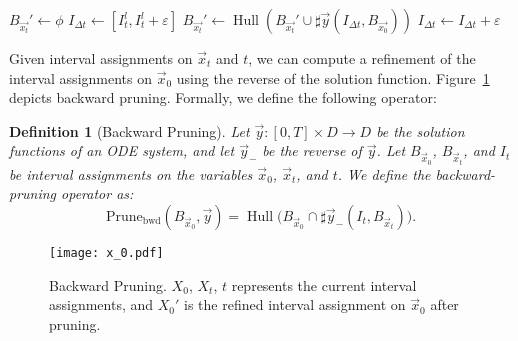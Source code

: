 \documentclass[12pt]{article}
\newtheorem{definition}[theorem]{Definition}
\newcommand{\prunefwd}{\mathrm{Prune}_{\mathrm{fwd}}}
\newcommand{\BXt}{\ensuremath{B_{\vec{x_t}}}}
\newcommand{\BXz}{\ensuremath{B_{\vec{x_0}}}}
\DeclareMathOperator{\Hull}{Hull}
\begin{document}
\begin{algorithm}\label{alg:ForwardP}
\caption{$\prunefwd(\sharp{\vec{y}}, \BXz, \BXt, I_t)$}\label{forward}
\begin{algorithmic}[1]
  \State $\BXt' \gets \phi$\;
  \State $I_{{\Delta}t} \gets [I_t^l, I_t^l + {\varepsilon}]$\;
      \State $\BXt' \gets \Hull(\BXt' \cup \sharp{\vec{y}}({{I_{{\Delta}t}}}, \BXz))$
      \State ${{I_{{\Delta}t}}} \gets {I_{{\Delta}t}} + {\varepsilon}$
  \EndWhile
  \State \Return{$\BXt \cap \BXt'$}
\end{algorithmic}
\end{algorithm}

 Given interval assignments on $\vec x_t$ and $t$, we can compute a refinement of the interval assignments on $\vec x_0$ using the reverse of the solution function. Figure~\ref{x0p} depicts backward pruning. Formally, we define the following operator:
\begin{definition}[Backward Pruning]
Let $\vec y:[0,T]\times D\rightarrow D$ be the solution functions of an ODE system, and let $\vec y_-$ be the reverse of $\vec y$. Let $B_{\vec x_0}$, $B_{\vec x_t}$, and $I_{t}$ be interval assignments on the variables $\vec x_0$, $\vec x_t$, and $t$. We define the backward-pruning operator as:
$$\mathrm{Prune}_{\mathrm{bwd}}(B_{\vec x_0}, \vec y) =\Hull\Big(B_{\vec x_0}\cap \sharp \vec y_-(I_t, B_{\vec x_t})\Big).$$
\end{definition}
\begin{figure}
\begin{center}
\texttt{[image: x\_0.pdf]}
\end{center}
\caption{Backward Pruning. $X_0$, $X_t$, $t$ represents the current interval assignments, and $X_0'$ is the refined interval assignment on $\vec x_0$ after pruning.
}\label{x0p}
\end{figure}
\end{document}
